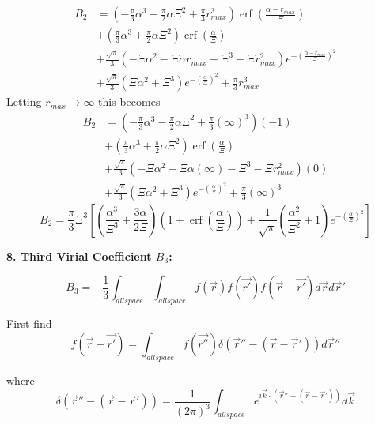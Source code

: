 \documentclass[12pt]{article}
\begin{document}
\begin{align}
  B_2 &= \left(-\frac{\pi}{3}\alpha^3-\frac{\pi}{2}\alpha\Xi^2+\frac{\pi}{3}r_{max}^3\right)\operatorname{erf}\left(\frac{\alpha-r_{max}}{\Xi}\right) \\
      &+ \left(\frac{\pi}{3}\alpha^3+\frac{\pi}{2}\alpha\Xi^2\right)\operatorname{erf}\left(\frac{\alpha}{\Xi}\right) \\
      &+ \frac{\sqrt{\pi}}{3}\left(-\Xi\alpha^2-\Xi\alpha r_{max}-\Xi^3-\Xi r_{max}^2\right)e^{-{\left(\frac{\alpha-r_{max}}{\Xi}\right)^2}} \\
      &+ \frac{\sqrt{\pi}}{3}\left(\Xi\alpha^2+\Xi^3\right)e^{-\left(\frac{\alpha}{\Xi}\right)^2}+\frac{\pi}{3}r_{max}^3 
\end{align}
Letting $r_{max}\rightarrow\infty$ this becomes
\begin{align}
  B_2 &= \left(-\frac{\pi}{3}\alpha^3-\frac{\pi}{2}\alpha\Xi^2+\frac{\pi}{3}\left(\infty\right)^3\right)\left(-1\right) \\
      &+ \left(\frac{\pi}{3}\alpha^3+\frac{\pi}{2}\alpha\Xi^2\right)\operatorname{erf}\left(\frac{\alpha}{\Xi}\right) \\
      &+ \frac{\sqrt{\pi}}{3}\left(-\Xi\alpha^2-\Xi\alpha\left(\infty\right)-\Xi^3-\Xi r_{max}^2\right)\left(0\right) \\
      &+ \frac{\sqrt{\pi}}{3}\left(\Xi\alpha^2+\Xi^3\right)e^{-\left(\frac{\alpha}{\Xi}\right)^2}+\frac{\pi}{3}\left(\infty\right)^3 
\end{align}
\begin{equation}B_2 = \frac{\pi}{3}\Xi^3\left[\left(\frac{\alpha^3}{\Xi^3}+\frac{3\alpha}{2\Xi}\right)\left(1+\operatorname{erf}\left(\frac{\alpha}{\Xi}\right)\right)+\frac{1}{\sqrt{\pi}}\left(\frac{\alpha^2}{\Xi^2}+1\right)e^{-\left(\frac{\alpha}{\Xi}\right)^2}\right]\end{equation}



\[{}\]
\textbf{8. Third Virial Coefficient $B_{3}$:}

\begin{equation}\label{B3}B_3=-\frac{1}{3}\int_{allspace}\int_{allspace}f(\vec{r})f(\vec{r'})f(\vec{r}-\vec{r'})d\vec rd\vec r'\end{equation}

First find
\begin{equation}f(\vec{r}-\vec{r'})=\int_{allspace}f(\vec{r''})\delta(\vec{r}''-(\vec{r}-\vec{r}'))d\vec r'' \end{equation}

where
\begin{equation}{\delta}(\vec{r}''-(\vec{r}-\vec{r}'))={ \frac{1}{\left(2\pi\right)^3}\int_{allspace} e^{i\vec k\cdot (\vec{r}''-(\vec r-\vec r'))}d\vec{k}}\end{equation} 
\end{document}
